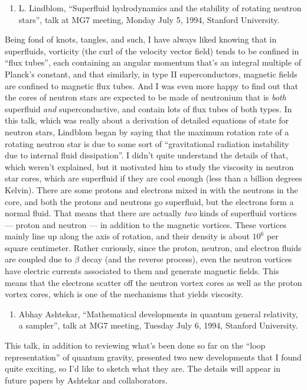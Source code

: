 \documentclass{article}
\def\tightlist{}
\begin{document}
\begin{enumerate}
\def\labelenumi{\arabic{enumi})}
\tightlist
\item
  L. Lindblom, ``Superfluid hydrodynamics and the stability of rotating
  neutron stars'', talk at MG7 meeting, Monday July 5, 1994, Stanford
  University.
\end{enumerate}

Being fond of knots, tangles, and such, I have always liked knowing that
in superfluids, vorticity (the curl of the velocity vector field) tends
to be confined in ``flux tubes'', each containing an angular momentum
that's an integral multiple of Planck's constant, and that similarly, in
type II superconductors, magnetic fields are confined to magnetic flux
tubes. And I was even more happy to find out that the cores of neutron
stars are expected to be made of neutronium that is \emph{both}
superfluid \emph{and} superconductive, and contain lots of flux tubes of
both types. In this talk, which was really about a derivation of
detailed equations of state for neutron stars, Lindblom began by saying
that the maximum rotation rate of a rotating neutron star is due to some
sort of ``gravitational radiation instability due to internal fluid
dissipation''. I didn't quite understand the details of that, which
weren't explained, but it motivated him to study the viscosity in
neutron star cores, which are superfluid if they are cool enough (less
than a billion degrees Kelvin). There are some protons and electrons
mixed in with the neutrons in the core, and both the protons and
neutrons go superfluid, but the electrons form a normal fluid. That
means that there are actually \emph{two} kinds of superfluid vortices
--- proton and neutron --- in addition to the magnetic vortices. These
vortices mainly line up along the axis of rotation, and their density is
about \(10^6\) per square centimeter. Rather curiously, since the
proton, neutron, and electron fluids are coupled due to \(\beta\) decay
(and the reverse process), even the neutron vortices have electric
currents associated to them and generate magnetic fields. This means
that the electrons scatter off the neutron vortex cores as well as the
proton vortex cores, which is one of the mechanisms that yields
viscosity.

\begin{enumerate}
\def\labelenumi{\arabic{enumi})}
\setcounter{enumi}{1}
\tightlist
\item
  Abhay Ashtekar, ``Mathematical developments in quantum general
  relativity, a sampler'', talk at MG7 meeting, Tuesday July 6, 1994,
  Stanford University.
\end{enumerate}
\noindent
This talk, in addition to reviewing what's been done so far on the
``loop representation'' of quantum gravity, presented two new
developments that I found quite exciting, so I'd like to sketch what
they are. The details will appear in future papers by Ashtekar and
collaborators.
\end{document}
